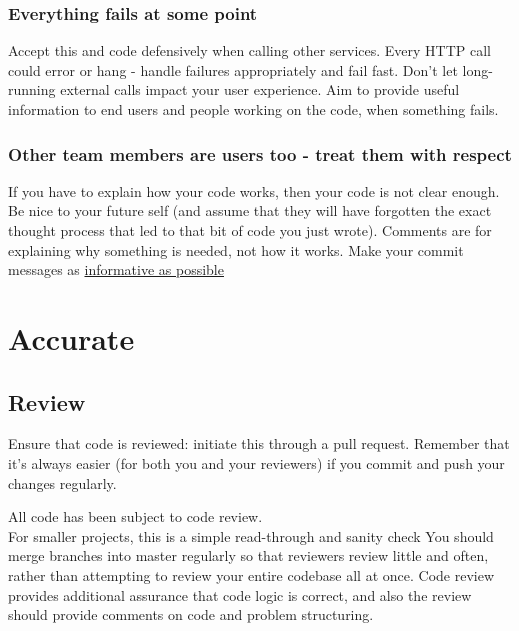 \documentclass[]{book}
\begin{document}
\hypertarget{errors}{%
\subsubsection{Everything fails at some point}\label{errors}}

Accept this and code defensively when calling other services.
Every HTTP call could error or hang - handle failures appropriately and fail fast. Don't let long-running external calls impact your user experience.
Aim to provide useful information to end users and people working on the code, when something fails.

\hypertarget{users}{%
\subsubsection{Other team members are users too - treat them with respect}\label{users}}

If you have to explain how your code works, then your code is not clear enough.
Be nice to your future self (and assume that they will have forgotten the exact thought process that led to that bit of code you just wrote).
Comments are for explaining why something is needed, not how it works.
Make your commit messages as \href{https://robots.thoughtbot.com/5-useful-tips-for-a-better-commit-message}{informative as possible}

\hypertarget{accurate}{%
\section{Accurate}\label{accurate}}

\hypertarget{review}{%
\subsection{Review}\label{review}}

Ensure that code is reviewed: initiate this through a pull request. Remember that it's always easier (for both you and your reviewers) if you commit and push your changes regularly.

All code has been subject to code review.\\
For smaller projects, this is a simple read-through and sanity check You should merge branches into master regularly so that reviewers review little and often, rather than attempting to review your entire codebase all at once.
Code review provides additional assurance that code logic is correct, and also the review should provide comments on code and problem structuring.
\end{document}

